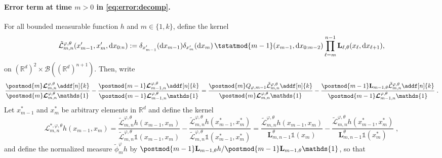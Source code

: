 \documentclass{article}
\newcommand{\precpar}{\varphi}
\newcommand{\intvect}[2]{\{ #1, #2 \}}
\newcommand{\1}{\mathbbm{1}}
\newcommand{\retrokmod}{\boldsymbol{\mathcal{L}}^{\precpar,\theta}}
\newcommand{\uk}[1]{\mathbf{L}_{#1}}
\def\1{\mathds{1}}
\newcommand{\rmd}{\ensuremath{\mathrm{d}}}
\newcommand{\eqdef}{\ensuremath{:=}}
\newcommand{\eqsp}{\;}
\begin{document}
\paragraph{Error term at time $m>0$ in \eqref{eq:error:decomp}. } For all bounded measurable function $h$ and $m \in \intvect{1}{k}$, define the kernel  
\begin{equation} \label{eq:def:retrokmod:joint}
    \tilde{\mathcal{L}}^{\varphi,\theta}_{m, n}(x'_{m-1},x_m', \rmd x_{0:n}) \eqdef \delta_{x'_{m-1}}(\rmd x_{m-1})\delta_{x_m'}(\rmd x_m) \, \tstatmod{m-1}(x_{m-1}, \rmd x_{0:m - 2}) \prod_{\ell = m}^{n - 1} \uk{\ell,\theta}(x_\ell, \rmd x_{\ell + 1}), 
\end{equation}
on  $(\mathbb{R}^d)^2 \times \mathcal{B}((\mathbb{R}^d)^{n+1})$.  Then, write
$$
 \frac{\postmod{m} \retrokmod_{m, n} \addf[n]{k}}{\postmod{m} \retrokmod_{m, n} \1_{}} - \frac{\postmod{m - 1} \retrokmod_{m - 1, n} \addf[n]{k}}{\postmod{m - 1} \retrokmod_{m - 1, n} \1_{}}  = \frac{\postmod{m} Q_{\varphi,m-1} \tilde{\mathcal{L}}^{\varphi,\theta}_{m, n} \addf[n]{k}}{\postmod{m} \retrokmod_{m, n} \1_{}} - \frac{\postmod{m - 1} \uk{m-1,\theta} \tilde{\mathcal{L}}^{\varphi,\theta}_{m, n} \addf[n]{k}}{\postmod{m - 1} \retrokmod_{m - 1, n} \1_{}} \eqsp.
$$
Let $x_{m-1}^*$ and $x_m^*$ be arbitrary elements in $\mathbb{R}^d$ and define the kernel
$$
\mathcal{L}^{*,\varphi,\theta}_{m, n}h(x_{m-1},x_m) = \frac{\tilde{\mathcal{L}}^{\varphi,\theta}_{m, n}h(x_{m-1},x_m) }{\tilde{\mathcal{L}}^{\varphi,\theta}_{m, n}\1(x_{m-1},x_m)} - \frac{\tilde{\mathcal{L}}^{\varphi,\theta}_{m, n}h(x^*_{m-1},x^*_m) }{\tilde{\mathcal{L}}^{\varphi,\theta}_{m, n}\1(x^*_{m-1},x^*_m)} = \frac{\tilde{\mathcal{L}}^{\varphi,\theta}_{m, n}h(x_{m-1},x_m) }{\uk{m, n - 1}^\theta\1(x_m)} - \frac{\tilde{\mathcal{L}}^{\varphi,\theta}_{m, n}h(x^*_{m-1},x^*_m) }{\uk{m, n - 1}^\theta\1(x^*_m)}\eqsp,
$$
and define the normalized measure $\tilde\phi^\varphi_mh$ by $\postmod{m - 1} \uk{m-1,\theta}h/\postmod{m - 1} \uk{m-1,\theta}\1$, so that
\end{document}
